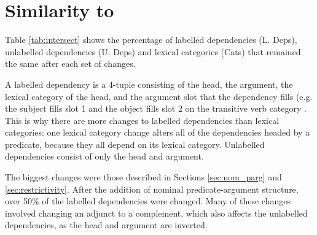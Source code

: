 \documentclass[11pt]{article}
\begin{document}
% 

\section{Similarity to \ccgbank}


Table \ref{tab:intersect} shows the percentage of labelled dependencies
(L. Deps), unlabelled dependencies (U. Deps) and lexical categories (Cats)
that remained the same after each set of changes.

A labelled dependency is a 4-tuple consisting of the head,
the argument, the lexical category of the head, and the argument slot that the
dependency fills (e.g. the subject fills slot 1 and the object fills slot 2 on
the transitive verb category . This is why there are
more changes to labelled dependencies than lexical categories: one lexical
category change alters all of the dependencies headed by a predicate, because
they all depend on its lexical category. Unlabelled dependencies consist
of only the head and argument.

The biggest changes were those described in Sections
\ref{sec:nom_parg} and \ref{sec:restrictivity}. After the addition of
nominal predicate-argument structure, over 50\% of the labelled dependencies
were changed. Many of these changes involved changing an adjunct to a
complement, which also affects the unlabelled dependencies, as the head and
argument are inverted.
\end{document}
